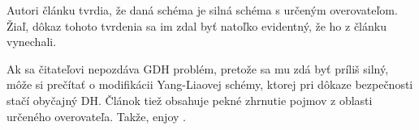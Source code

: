 Autori článku tvrdia, že daná schéma je silná schéma s určeným
overovateľom. Žiaľ, dôkaz tohoto tvrdenia sa im zdal byť natoľko evidentný, 
že ho z článku vynechali.

\begin{poznamka}
    Ak sa čitateľovi nepozdáva GDH problém, pretože sa mu zdá byť
    príliš silný, môže si prečítať o modifikácii Yang-Liaovej schémy,
    ktorej pri dôkaze bezpečnosti stačí obyčajný DH. Článok tiež
    obsahuje pekné zhrnutie pojmov z oblasti určeného overovateľa.
    Takže, enjoy \cite{designated_verifier_stanek}.
\end{poznamka}
